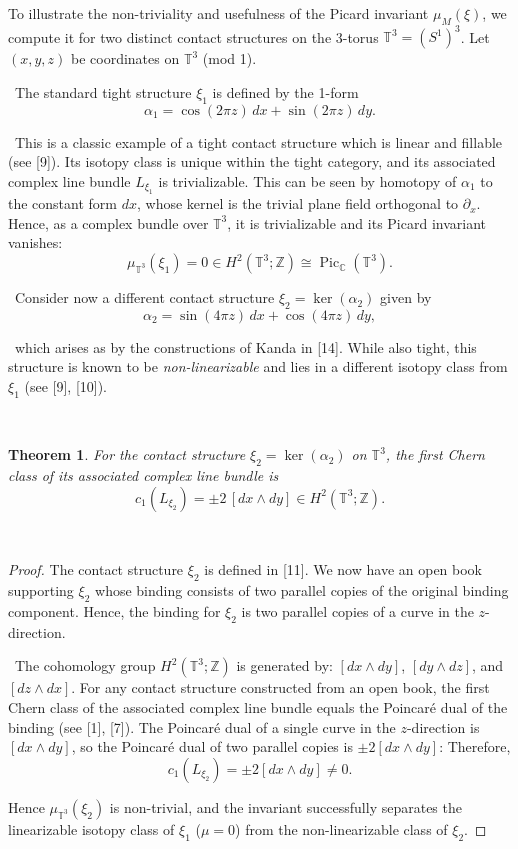 \documentclass{amsart}
\newtheorem{theorem}{Theorem}
\newcommand{\C}{\mathbb{C}}
\newcommand{\T}{\mathbb{T}}
\newcommand{\Pic}{\operatorname{Pic}}
\begin{document}
To illustrate the non-triviality and usefulness of the Picard invariant $\mu_M(\xi)$, we compute it for two distinct contact structures on the 3-torus $\T^3 = (S^1)^3$. Let $(x,y,z)$ be coordinates on $\T^3$ (mod 1).
\par\
The standard tight structure $\xi_1$ is defined by the 1-form
\[
\alpha_1 = \cos(2\pi z)\,dx + \sin(2\pi z)\,dy.
\]
\par\
This is a classic example of a tight contact structure which is linear and fillable (see [9]). Its isotopy class is unique within the tight category, and its associated complex line bundle $L_{\xi_1}$ is trivializable. This can be seen by homotopy of $\alpha_1$ to the constant form $dx$, whose kernel is the trivial plane field orthogonal to $\partial_x$. Hence, as a complex bundle over $\T^3$, it is trivializable and its Picard invariant vanishes:
\[
\mu_{\T^3}(\xi_1) = 0 \in H^2(\T^3;\mathbb{Z}) \cong \Pic_{\C}(\T^3).
\]
\par\
Consider now a different contact structure $\xi_2 = \ker(\alpha_2)$ given by
\[
\alpha_2 = \sin(4\pi z)\,dx + \cos(4\pi z)\,dy,
\]
\par\
which arises as by the constructions of Kanda in [14]. While also tight, this structure is known to be \emph{non-linearizable} and lies in a different isotopy class from $\xi_1$ (see [9], [10]).
\par\
\begin{theorem}
For the contact structure $\xi_2 = \ker(\alpha_2)$ on $\T^3$, the first Chern class of its associated complex line bundle is
\[
c_1(L_{\xi_2}) = \pm 2\,[dx \wedge dy] \in H^2(\T^3;\mathbb{Z}).
\]
\end{theorem}
\par\
\begin{proof}
The contact structure $\xi_2$ is defined in [11]. We now have an open book supporting $\xi_2$ whose binding consists of two parallel copies of the original binding component. Hence, the binding for $\xi_2$ is two parallel copies of a curve in the $z$-direction.
\par\
The cohomology group $H^2(\T^3; \mathbb{Z})$ is generated by:  $[dx \wedge dy]$, $[dy \wedge dz]$, and $[dz \wedge dx]$. For any contact structure constructed from an open book, the first Chern class of the associated complex line bundle equals the Poincaré dual of the binding (see [1], [7]). The Poincaré dual of a single curve in the $z$-direction is $[dx \wedge dy]$, so the Poincaré dual of two parallel copies is $\pm2[dx \wedge dy]$:
Therefore,
\[
c_1(L_{\xi_2}) = \pm 2[dx \wedge dy] \neq 0.
\]

Hence $\mu_{\T^3}(\xi_2)$ is non-trivial, and the invariant successfully separates the linearizable isotopy class of $\xi_1$ ($\mu = 0$) from the non-linearizable class of $\xi_2$.
\end{proof}
\end{document}
